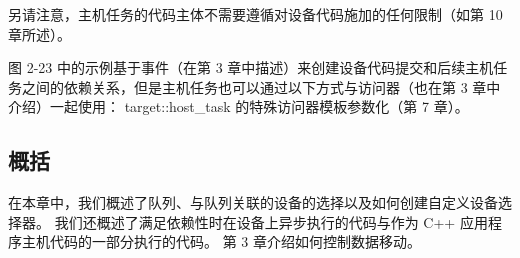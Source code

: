 另请注意，主机任务的代码主体不需要遵循对设备代码施加的任何限制（如第 10 章所述）。

图 2-23 中的示例基于事件（在第 3 章中描述）来创建设备代码提交和后续主机任务之间的依赖关系，但是主机任务也可以通过以下方式与访问器（也在第 3 章中介绍）一起使用： target::host\_task 的特殊访问器模板参数化（第 7 章）。

\subsection{概括}
在本章中，我们概述了队列、与队列关联的设备的选择以及如何创建自定义设备选择器。 我们还概述了满足依赖性时在设备上异步执行的代码与作为 C++ 应用程序主机代码的一部分执行的代码。 第 3 章介绍如何控制数据移动。